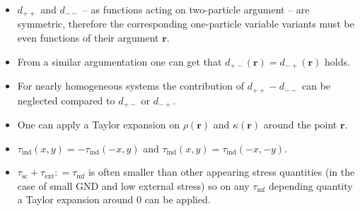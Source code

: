 \begin{itemize}
\item ${{d_{ +  + }}}$ and ${{d_{ -- }}}$ -- as functions acting on two-particle argument -- are symmetric, therefore the corresponding one-particle variable variants must be even functions of their argument ${\mathbf{r}}$.
\item From a similar argumentation one can get that ${d_{ +  - }}\left( {\mathbf{r}} \right) = {d_{ -  + }}\left( {\mathbf{r}} \right)$ holds.
\item For nearly homogeneous systems the contribution of ${d_{ +  + }} - {d_{ -  - }}$ can be neglected compared to ${d_{ +  - }}$ or ${d_{ -  + }}$.
\item One can apply a Taylor expansion on $\rho \left( {\mathbf{r}} \right)$ and $\kappa \left( {\mathbf{r}} \right)$ around the point ${\mathbf{r}}$.
\item ${\tau _{{\text{ind}}}}\left( {x,y} \right) =  - {\tau _{{\text{ind}}}}\left( { - x,y} \right)$ and ${\tau _{{\text{ind}}}}\left( {x,y} \right) = {\tau _{{\text{ind}}}}\left( { - x, - y} \right)$.
\item ${\tau _{{\text{sc}}}} + {\tau _{{\text{ext}}}}: = {\tau _{{\text{mf}}}}$ is often smaller than other appearing stress quantities (in the case of small GND and low external stress) so on any ${\tau _{{\text{mf}}}}$ depending quantity a Taylor expansion around $0$ can be applied.
\end{itemize}

